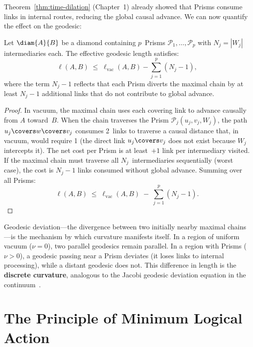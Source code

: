 \noindent
Theorem~\ref{thm:time-dilation} (Chapter~1) already showed that
Prisms consume links in internal routes, reducing the global causal
advance. We can now quantify the effect on the geodesic:

\begin{theorem}
\label{thm:geodesic-shortening}
Let $\diam{A}{B}$ be a diamond containing $p$~Prisms
$\mathcal{P}_1, \ldots, \mathcal{P}_p$ with
$N_j = |W_j|$ intermediaries each. The effective geodesic length
satisfies:
\begin{equation}
  \ell(A,B)
  \;\leq\;
  \ell_{\text{vac}}(A,B) - \sum_{j=1}^{p} (N_j - 1),
  \label{eq:geodesic-shortening}
\end{equation}
where the term $N_j - 1$ reflects that each Prism diverts the maximal
chain by at least $N_j - 1$ additional links that do not contribute to
global advance.
\end{theorem}

\begin{proof}
In vacuum, the maximal chain uses each covering link to advance
causally from $A$ toward~$B$. When the chain traverses the Prism
$\mathcal{P}_j(u_j, v_j, W_j)$, the path
$u_j \covers w \covers v_j$ consumes 2~links to traverse a causal
distance that, in vacuum, would require 1 (the direct link
$u_j \covers v_j$ does not exist because $W_j$ intercepts it). The
net cost per Prism is at least~$+1$ link per intermediary visited. If
the maximal chain must traverse all $N_j$~intermediaries sequentially
(worst case), the cost is $N_j - 1$ links consumed without global
advance. Summing over all Prisms:
\[
  \ell(A,B)
  \;\leq\;
  \ell_{\text{vac}}(A,B)
  \;-\; \sum_{j=1}^{p} (N_j - 1).
\]
\end{proof}

\noindent
Geodesic deviation---the divergence between two initially nearby
maximal chains---is the mechanism by which curvature manifests itself.
In a region of uniform vacuum ($\nu = 0$), two parallel geodesics
remain parallel. In a region with Prisms ($\nu > 0$), a geodesic
passing near a Prism deviates (it loses links to internal processing),
while a distant geodesic does not. This difference in length is the
\textbf{discrete curvature}, analogous to the Jacobi geodesic
deviation equation in the
continuum~\cite{wald1984,hawking1973}.

\section{The Principle of Minimum Logical Action}

